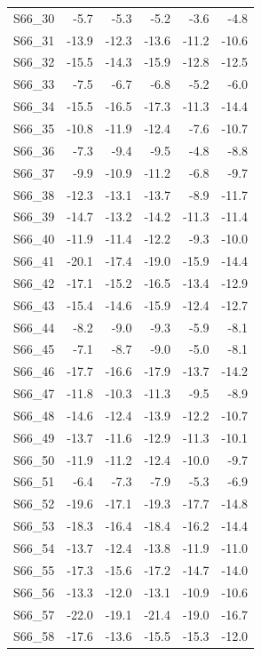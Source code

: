 \begin{longtable}{lrrrrr}
S66\_30 & -5.7 & -5.3 & -5.2 & -3.6 & -4.8 \\
S66\_31 & -13.9 & -12.3 & -13.6 & -11.2 & -10.6 \\
S66\_32 & -15.5 & -14.3 & -15.9 & -12.8 & -12.5 \\
S66\_33 & -7.5 & -6.7 & -6.8 & -5.2 & -6.0 \\
S66\_34 & -15.5 & -16.5 & -17.3 & -11.3 & -14.4 \\
S66\_35 & -10.8 & -11.9 & -12.4 & -7.6 & -10.7 \\
S66\_36 & -7.3 & -9.4 & -9.5 & -4.8 & -8.8 \\
S66\_37 & -9.9 & -10.9 & -11.2 & -6.8 & -9.7 \\
S66\_38 & -12.3 & -13.1 & -13.7 & -8.9 & -11.7 \\
S66\_39 & -14.7 & -13.2 & -14.2 & -11.3 & -11.4 \\
S66\_40 & -11.9 & -11.4 & -12.2 & -9.3 & -10.0 \\
S66\_41 & -20.1 & -17.4 & -19.0 & -15.9 & -14.4 \\
S66\_42 & -17.1 & -15.2 & -16.5 & -13.4 & -12.9 \\
S66\_43 & -15.4 & -14.6 & -15.9 & -12.4 & -12.7 \\
S66\_44 & -8.2 & -9.0 & -9.3 & -5.9 & -8.1 \\
S66\_45 & -7.1 & -8.7 & -9.0 & -5.0 & -8.1 \\
S66\_46 & -17.7 & -16.6 & -17.9 & -13.7 & -14.2 \\
S66\_47 & -11.8 & -10.3 & -11.3 & -9.5 & -8.9 \\
S66\_48 & -14.6 & -12.4 & -13.9 & -12.2 & -10.7 \\
S66\_49 & -13.7 & -11.6 & -12.9 & -11.3 & -10.1 \\
S66\_50 & -11.9 & -11.2 & -12.4 & -10.0 & -9.7 \\
S66\_51 & -6.4 & -7.3 & -7.9 & -5.3 & -6.9 \\
S66\_52 & -19.6 & -17.1 & -19.3 & -17.7 & -14.8 \\
S66\_53 & -18.3 & -16.4 & -18.4 & -16.2 & -14.4 \\
S66\_54 & -13.7 & -12.4 & -13.8 & -11.9 & -11.0 \\
S66\_55 & -17.3 & -15.6 & -17.2 & -14.7 & -14.0 \\
S66\_56 & -13.3 & -12.0 & -13.1 & -10.9 & -10.6 \\
S66\_57 & -22.0 & -19.1 & -21.4 & -19.0 & -16.7 \\
S66\_58 & -17.6 & -13.6 & -15.5 & -15.3 & -12.0 \\

\end{longtable}
